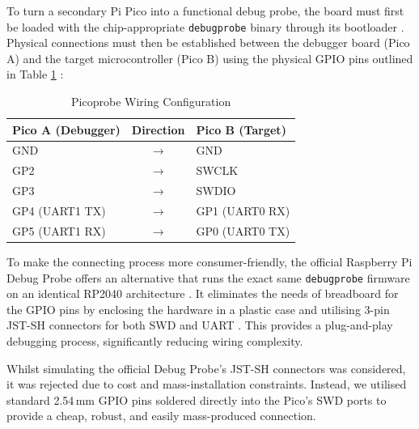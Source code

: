 To turn a secondary Pi Pico into a functional debug probe, the board must first be loaded with the chip-appropriate \texttt{debugprobe} binary through its bootloader \cite{pico_getting_started}. Physical connections must then be established between the debugger board (Pico A) and the target microcontroller (Pico B) using the physical GPIO pins outlined in Table \ref{tab:picoprobe_wiring} \cite{pico_getting_started}:

\begin{table}[ht]
\centering
\caption{Picoprobe Wiring Configuration}
\label{tab:picoprobe_wiring}
\begin{tabular}{lcl}
\hline
\textbf{Pico A (Debugger)} & \textbf{Direction} & \textbf{Pico B (Target)} \\ \hline
GND & $\rightarrow$ & GND \\
GP2 & $\rightarrow$ & SWCLK \\
GP3 & $\rightarrow$ & SWDIO \\
GP4 (UART1 TX) & $\rightarrow$ & GP1 (UART0 RX) \\
GP5 (UART1 RX) & $\rightarrow$ & GP0 (UART0 TX) \\ \hline
\end{tabular}
\end{table}

To make the connecting process more consumer-friendly, the official Raspberry Pi Debug Probe offers an alternative that runs the exact same \texttt{debugprobe} firmware on an identical RP2040 architecture \cite{debugprobe_docs}. It eliminates the needs of breadboard for the GPIO pins by enclosing the hardware in a plastic case and utilising 3-pin JST-SH connectors for both SWD and UART \cite{debug_connector_spec}. This provides a plug-and-play debugging process, significantly reducing wiring complexity.

Whilst simulating the official Debug Probe's JST-SH connectors was considered, it was rejected due to cost and mass-installation constraints. Instead, we utilised standard 2.54\,mm GPIO pins soldered directly into the Pico's SWD ports to provide a cheap, robust, and easily mass-produced connection.

